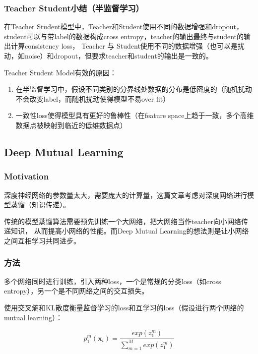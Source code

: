 \documentclass[UTF8]{ctexart}
\begin{document}
            \subsubsection{Teacher Student小结（半监督学习）}
                在Teacher Student模型中，Teacher和Student使用不同的数据增强和dropout，
                student可以与带label的数据构成cross entropy，teacher的输出最终与student的输出计算consistency loss，
                Teacher 与 Student使用不同的数据增强（也可以是扰动，如noise）和dropout，但要求teacher和student的输出是一致的。

                Teacher Student Model有效的原因：

                \begin{enumerate}
                    \item 在半监督学习中，假设不同类别的分界线处数据的分布是低密度的（随机扰动不会改变label，而随机扰动使得模型不易over fit）
                    \item 一致性loss使得模型具有更好的鲁棒性（在feature space上趋于一致，多个高维数据点被映射到临近的低维数据点）
                \end{enumerate}
        \subsection{Deep Mutual Learning}
            \subsubsection{Motivation}
                深度神经网络的参数量太大，需要庞大的计算量，这篇文章考虑对深度网络进行模型蒸馏（知识传递）。

                传统的模型蒸馏算法需要预先训练一个大网络，把大网络当作teacher向小网络传递知识，
                从而提高小网络的性能。而Deep Mutual Learning的想法则是让小网络之间互相学习共同进步。
            \subsubsection{方法}
                多个网络同时进行训练，引入两种loss，一个是常规的分类loss（如cross entropy），另一个是不同网络之间的交互损失。

                使用交叉熵和KL散度衡量监督学习的loss和互学习的loss（假设进行两个网络的mutual learning）：

                $$
                    p_{1}^{m}(\boldsymbol{x}_i) = \frac{exp(z_{1}^{m})}{\sum_{m=1}^{M} exp(z_{1}^{m})}
                $$
\end{document}
